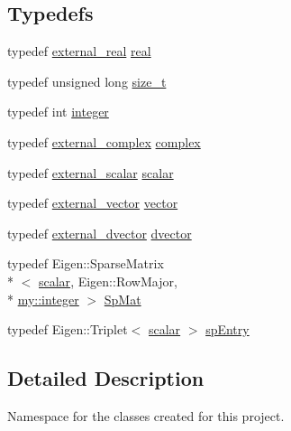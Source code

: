 \subsection*{Typedefs}
\begin{DoxyCompactItemize}
\item 
typedef \hyperlink{types__definitions_8hpp_afcf02aefd75cea1c0178a18bbfcb3d1a}{external\+\_\+real} \hyperlink{namespacemy_ad61baeaeda728a4c48dd64f93e44a46c}{real}
\item 
typedef unsigned long \hyperlink{namespacemy_ac9e2c9fc46dc44ed285976e482ee6ef4}{size\+\_\+t}
\item 
typedef int \hyperlink{namespacemy_a42365393c537edae1e89d20ff90d1923}{integer}
\item 
typedef \hyperlink{types__definitions_8hpp_a4c933564179b32b78cb338ca417616a8}{external\+\_\+complex} \hyperlink{namespacemy_a1ed6ea9ef51c0aa31f8b671fb04d758f}{complex}
\item 
typedef \hyperlink{types__definitions_8hpp_af5c52aebac57703de05e631d36a8ef2e}{external\+\_\+scalar} \hyperlink{namespacemy_a12d9dde7e2fb58fbd11051705c382a86}{scalar}
\item 
typedef \hyperlink{types__definitions_8hpp_aea218327e998c8c8c583f91564afd1b4}{external\+\_\+vector} \hyperlink{namespacemy_ae5357c26097990af91eec62b547ff125}{vector}
\item 
typedef \hyperlink{types__definitions_8hpp_ac4a55bdf0574672fe1bf23fe295feaf4}{external\+\_\+dvector} \hyperlink{namespacemy_afcfd7741f90501dab9d33b06ec3614d4}{dvector}
\item 
typedef Eigen\+::\+Sparse\+Matrix\\*
$<$ \hyperlink{namespacemy_a12d9dde7e2fb58fbd11051705c382a86}{scalar}, Eigen\+::\+Row\+Major, \\*
\hyperlink{namespacemy_a42365393c537edae1e89d20ff90d1923}{my\+::integer} $>$ \hyperlink{namespacemy_acdfb73d96fa976b10c1b9769cf5e9a93}{Sp\+Mat}
\item 
typedef Eigen\+::\+Triplet$<$ \hyperlink{namespacemy_a12d9dde7e2fb58fbd11051705c382a86}{scalar} $>$ \hyperlink{namespacemy_a9064fadfc17c5a260a26b7de6d559a5f}{sp\+Entry}
\end{DoxyCompactItemize}


\subsection{Detailed Description}
Namespace for the classes created for this project. 

